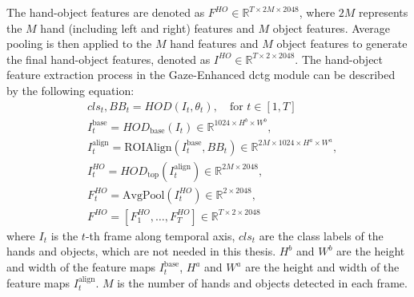 The hand-object features are denoted as $F^{HO} \in \mathbb{R}^{T \times 2M \times 2048}$, where $2M$ represents the $M$ hand (including left and right) features and $M$ object features. Average pooling is then applied to the $M$ hand features and $M$ object features to generate the final hand-object features, denoted as $I^{HO} \in \mathbb{R}^{T \times 2 \times 2048}$. The hand-object feature extraction process in the Gaze-Enhanced \gls{dctg} module can be described by the following equation:
\begin{equation}
    \begin{aligned}
        &cls_{t}, BB_t = HOD(I_t, \theta_t), \quad \text{for } t \in [1, T] \\[12pt]
        &I_t^{\text{base}} = HOD_{\text{base}}(I_t) \in \mathbb{R}^{1024 \times H^b \times W^b}, \\[12pt]
        &I_t^{\text{align}} = \text{ROIAlign}(I_t^{\text{base}}, BB_t) \in \mathbb{R}^{2M \times 1024 \times H^a \times W^a}, \\[12pt]
        &I_t^{HO} = HOD_{\text{top}}(I_t^{\text{align}}) \in \mathbb{R}^{2M \times 2048}, \\[12pt]
        &F_t^{HO} = \text{AvgPool}(I_t^{HO}) \in \mathbb{R}^{2 \times 2048}, \\[12pt]
        &F^{HO} = [F_1^{HO}, \ldots, F_T^{HO}]  \in \mathbb{R}^{T \times 2 \times 2048}
    \end{aligned}
    \label{eq:hand_object_feature}
\end{equation}
where $I_t$ is the $t$-th frame along temporal axis, $cls_t$ are the class labels of the hands and objects, which are not needed in this thesis. $H^b$ and $W^b$ are the height and width of the feature maps $I_t^{\text{base}}$, $H^a$ and $W^a$ are the height and width of the feature maps $I_t^{\text{align}}$. $M$ is the number of hands and objects detected in each frame.


